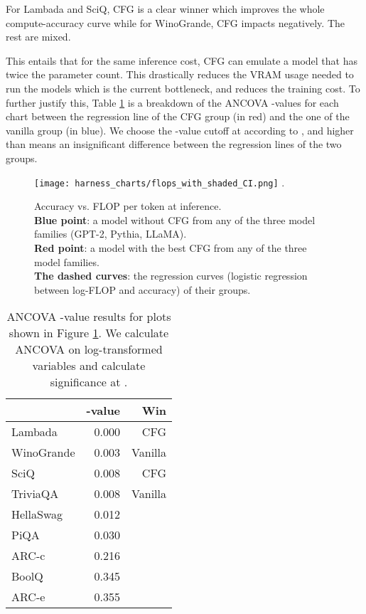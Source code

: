 \documentclass{article}
\begin{document}
For Lambada and SciQ, CFG is a clear winner which improves the whole compute-accuracy curve while for WinoGrande, CFG impacts negatively. The rest are mixed.

This entails that for the same inference cost, CFG can emulate a model that has twice the parameter count. This drastically reduces the VRAM usage needed to run the models which is the current bottleneck, and reduces the training cost. To further justify this, Table \ref{fig:flops} is a breakdown of the ANCOVA -values for each chart between the regression line of the CFG group (in red) and the one of the vanilla group (in blue). We choose the -value cutoff at  according to \cite{rutherford2011anova}, and higher than  means an insignificant difference between the regression lines of the two groups.

\begin{figure}
    \centering
    \texttt{[image: harness\_charts/flops\_with\_shaded\_CI.png]} .
    \caption{Accuracy vs. FLOP per token at inference. \\\textbf{Blue point}: a model without CFG from any of the three model families (GPT-2, Pythia, LLaMA). \\\textbf{Red point}: a model with the best CFG from any of the three model families. \\\textbf{The dashed curves}: the regression curves (logistic regression between log-FLOP and accuracy) of their groups.
}
    \label{fig:flops}
\end{figure}

\begin{table}
\centering
\begin{tabular}{lrr}
\toprule
 & -value & Win \\
\midrule
Lambada & 0.000 & CFG \\
WinoGrande & 0.003 & Vanilla \\
SciQ & 0.008 & CFG \\
TriviaQA & 0.008 & Vanilla \\
HellaSwag & 0.012 &  \\
PiQA & 0.030 &  \\
ARC-c & 0.216 &  \\
BoolQ & 0.345 &  \\
ARC-e & 0.355 &  \\
\bottomrule
\end{tabular}
\caption{ANCOVA -value results for plots shown in Figure \ref{fig:flops}. We calculate ANCOVA on log-transformed variables and calculate significance at .}
\end{table}
\end{document}
